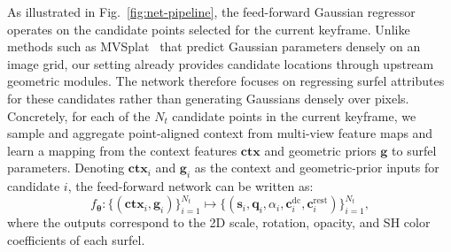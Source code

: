 \documentclass[letterpaper, 10pt, conference]{ieeeconf}
\begin{document}
As illustrated in Fig.~\ref{fig:net-pipeline}, the feed-forward Gaussian regressor operates on the candidate points selected for the current keyframe. Unlike methods such as MVSplat~\cite{chen2024mvsplat} that predict Gaussian parameters densely on an image grid, our setting already provides candidate locations through upstream geometric modules. The network therefore focuses on regressing surfel attributes for these candidates rather than generating Gaussians densely over pixels. Concretely, for each of the $N_t$ candidate points in the current keyframe, we sample and aggregate point-aligned context from multi-view feature maps and learn a mapping from the context features $\mathbf{ctx}$ and geometric priors $\mathbf{g}$ to surfel parameters. Denoting $\mathbf{ctx}_i$ and $\mathbf{g}_i$ as the context and geometric-prior inputs for candidate $i$, the feed-forward network can be written as:
%
\begin{equation}
f_{\boldsymbol{\theta}} : \{(\mathbf{ctx}_i, \mathbf{g}_i)\}_{i=1}^{N_t}
\mapsto
\{(\mathbf{s}_i, \mathbf{q}_i, \alpha_i, \mathbf{c}_i^{\mathrm{dc}}, \mathbf{c}_i^{\mathrm{rest}})\}_{i=1}^{N_t},
\end{equation}
%
where the outputs correspond to the 2D scale, rotation, opacity, and SH color coefficients of each surfel.
\end{document}
